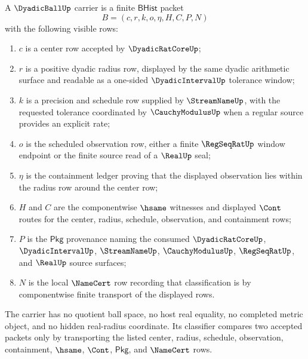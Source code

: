 \begin{definition}
\label{def:dyadicball-carrier}
A $\DyadicBallUp$ carrier is a finite $\mathsf{BHist}$ packet
$$
B=(c,r,k,o,\eta,H,C,P,N)
$$
with the following visible rows:
\begin{enumerate}
\item $c$ is a center row accepted by $\DyadicRatCoreUp$;
\item $r$ is a positive dyadic radius row, displayed by the same dyadic
arithmetic surface and readable as a one-sided
$\DyadicIntervalUp$ tolerance window;
\item $k$ is a precision and schedule row supplied by $\StreamNameUp$, with
the requested tolerance coordinated by $\CauchyModulusUp$ when a regular
source provides an explicit rate;
\item $o$ is the scheduled observation row, either a finite
$\RegSeqRatUp$ window endpoint or the finite source read of a $\RealUp$
seal;
\item $\eta$ is the containment ledger proving that the displayed observation
lies within the radius row around the center row;
\item $H$ and $C$ are the componentwise $\hsame$ witnesses and displayed
$\Cont$ routes for the center, radius, schedule, observation, and
containment rows;
\item $P$ is the $\mathsf{Pkg}$ provenance naming the consumed
$\DyadicRatCoreUp$, $\DyadicIntervalUp$, $\StreamNameUp$,
$\CauchyModulusUp$, $\RegSeqRatUp$, and $\RealUp$ source surfaces;
\item $N$ is the local $\NameCert$ row recording that classification is by
componentwise finite transport of the displayed rows.
\end{enumerate}
The carrier has no quotient ball space, no host real equality, no completed
metric object, and no hidden real-radius coordinate. Its classifier compares
two accepted packets only by transporting the listed center, radius, schedule,
observation, containment, $\hsame$, $\Cont$, $\mathsf{Pkg}$, and $\NameCert$
rows.
\end{definition}

